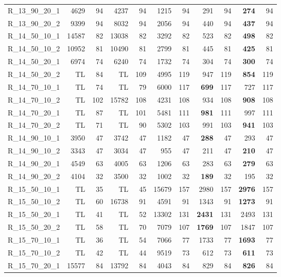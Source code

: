 \documentclass{article}
\begin{document}
\begin{longtable}{lrrrrrrrrrr}
R\_13\_90\_20\_1 & 4629 & 94 & 4237 & 94 & 1215 & 94 & 291 & 94 & \textbf{274} & 94 \\
R\_13\_90\_20\_2 & 9399 & 94 & 8032 & 94 & 2056 & 94 & 440 & 94 & \textbf{437} & 94 \\
R\_14\_50\_10\_1 & 14587 & 82 & 13038 & 82 & 3292 & 82 & 523 & 82 & \textbf{498} & 82 \\
R\_14\_50\_10\_2 & 10952 & 81 & 10490 & 81 & 2799 & 81 & 445 & 81 & \textbf{425} & 81 \\
R\_14\_50\_20\_1 & 6974 & 74 & 6240 & 74 & 1732 & 74 & 304 & 74 & \textbf{300} & 74 \\
R\_14\_50\_20\_2 & TL & 84 & TL & 109 & 4995 & 119 & 947 & 119 & \textbf{854} & 119 \\
R\_14\_70\_10\_1 & TL & 74 & TL & 79 & 6000 & 117 & \textbf{699} & 117 & 727 & 117 \\
R\_14\_70\_10\_2 & TL & 102 & 15782 & 108 & 4231 & 108 & 934 & 108 & \textbf{908} & 108 \\
R\_14\_70\_20\_1 & TL & 87 & TL & 101 & 5481 & 111 & \textbf{981} & 111 & 997 & 111 \\
R\_14\_70\_20\_2 & TL & 71 & TL & 90 & 5302 & 103 & 991 & 103 & \textbf{941} & 103 \\
R\_14\_90\_10\_1 & 3950 & 47 & 3742 & 47 & 1182 & 47 & \textbf{288} & 47 & 293 & 47 \\
R\_14\_90\_10\_2 & 3343 & 47 & 3034 & 47 & 955 & 47 & 211 & 47 & \textbf{210} & 47 \\
R\_14\_90\_20\_1 & 4549 & 63 & 4005 & 63 & 1206 & 63 & 283 & 63 & \textbf{279} & 63 \\
R\_14\_90\_20\_2 & 4104 & 32 & 3500 & 32 & 1002 & 32 & \textbf{189} & 32 & 195 & 32 \\
R\_15\_50\_10\_1 & TL & 35 & TL & 45 & 15679 & 157 & 2980 & 157 & \textbf{2976} & 157 \\
R\_15\_50\_10\_2 & TL & 60 & 16738 & 91 & 4591 & 91 & 1343 & 91 & \textbf{1273} & 91 \\
R\_15\_50\_20\_1 & TL & 41 & TL & 52 & 13302 & 131 & \textbf{2431} & 131 & 2493 & 131 \\
R\_15\_50\_20\_2 & TL & 58 & TL & 70 & 7079 & 107 & \textbf{1769} & 107 & 1847 & 107 \\
R\_15\_70\_10\_1 & TL & 36 & TL & 54 & 7066 & 77 & 1733 & 77 & \textbf{1693} & 77 \\
R\_15\_70\_10\_2 & TL & 42 & TL & 44 & 9519 & 73 & 612 & 73 & \textbf{611} & 73 \\
R\_15\_70\_20\_1 & 15577 & 84 & 13792 & 84 & 4043 & 84 & 829 & 84 & \textbf{826} & 84 \\

\end{longtable}
\end{document}
